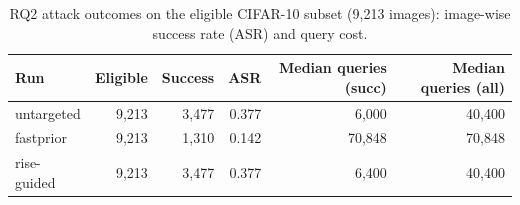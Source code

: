 \begin{table}[t]
\centering
\small
\caption{RQ2 attack outcomes on the eligible CIFAR-10 subset (9{,}213 images): image-wise success rate (ASR) and query cost.}
\label{tab:rq2_attack_summary}
\begin{tabular}{lrrrrr}
\toprule
Run & Eligible & Success & ASR & Median queries (succ) & Median queries (all) \\
\midrule
untargeted & 9,213 & 3,477 & 0.377 & 6,000 & 40,400 \\
fastprior & 9,213 & 1,310 & 0.142 & 70,848 & 70,848 \\
rise-guided & 9,213 & 3,477 & 0.377 & 6,400 & 40,400 \\
\bottomrule
\end{tabular}

\end{table}
